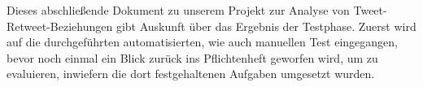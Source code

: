 Dieses abschließende Dokument zu unserem Projekt zur Analyse von Tweet-Retweet-Beziehungen gibt Auskunft über das Ergebnis der Testphase.
Zuerst wird auf die durchgeführten automatisierten, wie auch manuellen Test eingegangen, bevor noch einmal ein Blick zurück ins Pflichtenheft geworfen wird, um zu evaluieren, inwiefern die dort festgehaltenen Aufgaben umgesetzt wurden. 